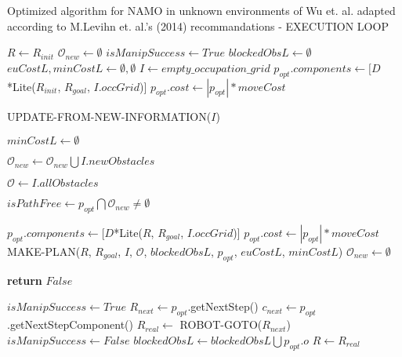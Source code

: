 \begin{algorithm}[H]

  \caption{Optimized algorithm for NAMO in unknown environments of Wu et. al. adapted according to M.Levihn et. al.'s (2014) recommandations - EXECUTION LOOP}

  \label{alg:02-levihn-makeandexecuteplan}

  \begin{algorithmic}[1]


      \State $R \gets R_{init}$
      \State $\mathcal{O}_{new} \gets \emptyset$
      \State $isManipSuccess \gets True$
      \State $blockedObsL \gets \emptyset$
      \State $euCostL, minCostL \gets \emptyset, \emptyset$
      \State $I \gets empty\_occupation\_grid$
      \State $p_{opt}.components \gets [D$*Lite($R_{init}$, $R_{goal}$, $I.occGrid$)] 
      \State $p_{opt}.cost \gets |p_{opt}| * moveCost$


        \State UPDATE-FROM-NEW-INFORMATION($I$) 

          \State $minCostL \gets \emptyset$
        \EndIf

        \State $\mathcal{O}_{new} \gets \mathcal{O}_{new} \bigcup I.newObstacles$

        \State $\mathcal{O} \gets I.allObstacles$

        \State $isPathFree \gets p_{opt} \bigcap \mathcal{O}_{new} \neq \emptyset$

          \State $p_{opt}.components \gets [D$*Lite($R$, $R_{goal}$, $I.occGrid$)]
          \State $p_{opt}.cost \gets |p_{opt}| * moveCost$
          \State MAKE-PLAN($R$, $R_{goal}$, $I$, $\mathcal{O}$, $blockedObsL$, $p_{opt}$, $euCostL$, $minCostL$)
          \State $\mathcal{O}_{new} \gets \emptyset$
        \EndIf

          \State \textbf{return} $False$
        \EndIf

        \State $isManipSuccess \gets True$
        \State $R_{next} \gets p_{opt}$.getNextStep()
        \State $c_{next} \gets p_{opt}$.getNextStepComponent()
        \State $R_{real} \gets$ ROBOT-GOTO($R_{next}$)
          \State $isManipSuccess \gets False$
          \State $blockedObsL \gets blockedObsL \bigcup p_{opt}.o$
        \EndIf
        \State $R \gets R_{real}$


\end{algorithmic}
\end{algorithm}
